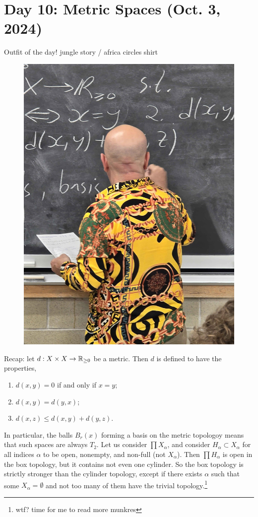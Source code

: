 \section{Day 10: Metric Spaces (Oct. 3, 2024)}
Outfit of the day! jungle story / africa circles shirt
\begin{figure}[h]
    \centering
    \includegraphics[scale=0.1]{MAT327 Notes/Dror Shirts/dror day 10 shirt.jpg}
\end{figure}

Recap: let $d : X \times X \to \mathbb R_{\geq 0}$ be a metric. Then $d$ is defined to have the properties,
\begin{enumerate}[label=(\alph*)]
    \item $d(x, y) = 0$ if and only if $x = y$;
    \item $d(x, y) = d(y, x)$;
    \item $d(x, z) \leq d(x, y) + d(y, z)$.
\end{enumerate}
In particular, the balls $B_r(x)$ forming a basis on the metric topologoy means that such spaces are always $T_2$.
\medskip\newline
Let us consider $\prod X_\alpha$, and consider $H_\alpha \subset X_\alpha$ for all indices $\alpha$ to be open, nonempty, and non-full (not $X_\alpha$). Then $\prod H_\alpha$ is open in the box topology, but it contains not even one cylinder. So the box topology is strictly stronger than the cylinder topology, except if there exists $\alpha$ such that some $X_\alpha = \emptyset$ and not too many of them have the trivial topology.\footnote{wtf? time for me to read more munkres}

